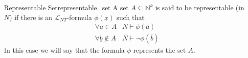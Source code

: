 \begin{definition}{Representable Set}{representable_set}
A set $A \subseteq \mathbb{N}^{k}$ is said to be representable (in $N$) if there is an $\mathcal{L}_{N T}$-formula $\phi(\underline{x})$ such that
$$
\begin{array}{ll}
\forall a \in A & N \vdash \phi(\bar{a}) \\
\forall \underline{b} \notin A & N \vdash \neg \phi(\bar{b})
\end{array}
$$
In this case we will say that the formula $\phi$ represents the set $A$.
\end{definition}
